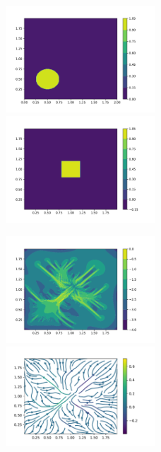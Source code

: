 \documentclass[letterpaper,12pt]{article}
\theoremstyle{plain}
\theoremstyle{remark}
\theoremstyle{remark}
\theoremstyle{remark}
\numberwithin{equation}{section}
\begin{document}
\begin{figure}
  \includegraphics[width=0.5\textwidth]{5/m1}
  \includegraphics[width=0.5\textwidth]{5/s}
\end{figure}
\begin{figure}
  \includegraphics[width=0.5\textwidth]{5/PCG}
  \includegraphics[width=0.5\textwidth]{5/vector}
\end{figure}
\end{document}
